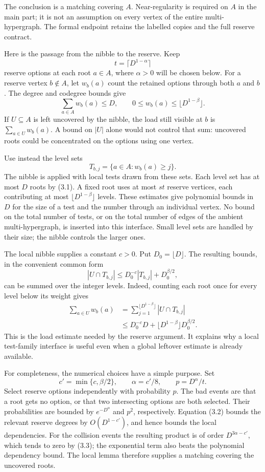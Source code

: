\documentclass[english,11pt,a4paper]{article}
\begin{document}
The conclusion is a matching covering \(A\). Near-regularity is required on \(A\) in the main part; it is not an assumption on every vertex of the entire multi-hypergraph. The formal endpoint retains the labelled copies and the full reserve contract.

Here is the passage from the nibble to the reserve. Keep \[t=\lceil D^{1-\alpha}\rceil\] reserve options at each root \(a\in A\), where \(\alpha>0\) will be chosen below. For a reserve vertex \(b\notin A\), let \(w_b(a)\) count the retained options through both \(a\) and \(b\). The degree and codegree bounds give \[\sum_{a\in A}w_b(a)\le D,
\qquad
0\le w_b(a)\le\lfloor D^{1-\beta}\rfloor.
\tag{3.1}\] If \(U\subseteq A\) is left uncovered by the nibble, the load still visible at \(b\) is \(\sum_{a\in U}w_b(a)\). A bound on \(|U|\) alone would not control that sum: uncovered roots could be concentrated on the options using one vertex.

Use instead the level sets \[T_{b,j}=\{a\in A:w_b(a)\ge j\}.\] The nibble is applied with local tests drawn from these sets. Each level set has at most \(D\) roots by (3.1). A fixed root uses at most \(s t\) reserve vertices, each contributing at most \(\lfloor D^{1-\beta}\rfloor\) levels. These estimates give polynomial bounds in \(D\) for the size of a test and the number through an individual vertex. No bound on the total number of tests, or on the total number of edges of the ambient multi-hypergraph, is inserted into this interface. Small level sets are handled by their size; the nibble controls the larger ones.

The local nibble supplies a constant \(c>0\). Put \(D_0=\lfloor D\rfloor\). The resulting bounds, in the convenient common form \[|U\cap T_{b,j}|
\le D_0^{-c}|T_{b,j}|+D_0^{\beta/2},\] can be summed over the integer levels. Indeed, counting each root once for every level below its weight gives \[\begin{aligned}
\sum_{a\in U}w_b(a)
&=\sum_{j=1}^{\lfloor D^{1-\beta}\rfloor}|U\cap T_{b,j}|\\
&\le D_0^{-c}D+
 \lfloor D^{1-\beta}\rfloor D_0^{\beta/2}.
\end{aligned}
\tag{3.2}\] This is the load estimate needed by the reserve argument. It explains why a local test-family interface is useful even when a global leftover estimate is already available.

For completeness, the numerical choices have a simple purpose. Set \[c'=\min\{c,\beta/2\},\qquad
\alpha=c'/8,\qquad p=D^\alpha/t.
\tag{3.3}\] Select reserve options independently with probability \(p\). The bad events are that a root gets no option, or that two intersecting options are both selected. Their probabilities are bounded by \(e^{-D^\alpha}\) and \(p^2\), respectively. Equation (3.2) bounds the relevant reserve degrees by \(O(D^{1-c'})\), and hence bounds the local dependencies. For the collision events the resulting product is of order \(D^{3\alpha-c'}\), which tends to zero by (3.3); the exponential term also beats the polynomial dependency bound. The local lemma therefore supplies a matching covering the uncovered roots.
\end{document}

